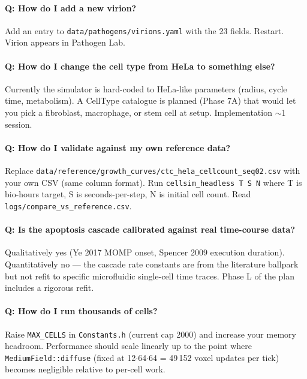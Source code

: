 \documentclass[11pt,letterpaper,twoside,openany]{book}
\newcommand{\code}[1]{\texttt{#1}}
\newcommand{\file}[1]{\texttt{\small#1}}
\begin{document}
\paragraph{Q: How do I add a new virion?}

Add an entry to \file{data/pathogens/virions.yaml} with the 23
fields. Restart. Virion appears in Pathogen Lab.

\paragraph{Q: How do I change the cell type from HeLa to
something else?}

Currently the simulator is hard-coded to HeLa-like parameters
(radius, cycle time, metabolism). A CellType catalogue is planned
(Phase 7A) that would let you pick a fibroblast, macrophage, or
stem cell at setup. Implementation $\sim$1 session.

\paragraph{Q: How do I validate against my own reference data?}

Replace \file{data/reference/growth\_curves/ctc\_hela\_cellcount\_seq02.csv}
with your own CSV (same column format). Run
\code{cellsim\_headless T S N} where T is bio-hours target,
S is seconds-per-step, N is initial cell count. Read
\file{logs/compare\_vs\_reference.csv}.

\paragraph{Q: Is the apoptosis cascade calibrated against real
time-course data?}

Qualitatively yes (Ye 2017 MOMP onset, Spencer 2009 execution
duration). Quantitatively no --- the cascade rate constants are
from the literature ballpark but not refit to specific
microfluidic single-cell time traces. Phase L of the plan
includes a rigorous refit.

\paragraph{Q: How do I run thousands of cells?}

Raise \code{MAX\_CELLS} in \file{Constants.h} (current cap 2000)
and increase your memory headroom. Performance should scale
linearly up to the point where \code{MediumField::diffuse} (fixed
at 12$\cdot$64$\cdot$64 = 49\,152 voxel updates per tick) becomes
negligible relative to per-cell work.
\end{document}
